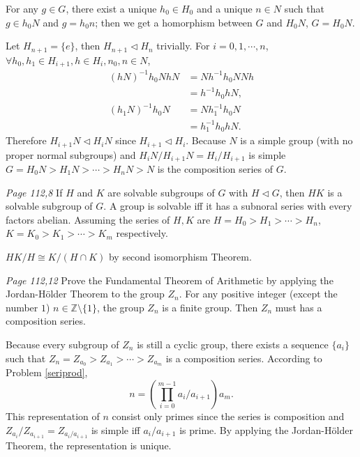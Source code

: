 \begin{enumerate}
For any $g\in G$, there exist a unique $h_0\in H_0$ and a unique $n\in N$ such that $g\in h_0N$ and $g=h_0 n$; then we get a homorphism between $G$ and $H_0N$, $G=H_0N$.

Let $H_{n+1}=\{e\}$, then $H_{n+1}\lhd H_{n}$ trivially. For $i=0,1,\cdots,n$, $\forall h_0, h_1\in H_{i+1}, h\in H_{i}, n_0,n\in N$, 
\begin{align*}
	(hN)^{-1} h_0N hN &= N h^{-1} h_0N Nh
	\\ &= h^{-1} h_0 h N,
	\\ (h_1N)^{-1} h_0N &= N h_1^{-1} h_0N
	\\ &= h_1^{-1} h_0 h N.
\end{align*}
Therefore $H_{i+1}N\lhd H_{i}N$ since $H_{i+1}\lhd H_{i}$. Because $N$ is a simple group (with no proper normal subgroups) and $H_{i}N / H_{i+1}N=H_i/H_{i+1}$ is simple 
$G=H_0N>H_1N>\cdots>H_nN>N$ is the composition series of $G$.

\prob\textit{Page 112,8} If $H$ and $K$ are solvable subgroups of $G$ with $H\lhd G$, then $HK$ is a solvable subgroup of $G$.
\soln A group is solvable iff it has a subnoral series with every factors abelian. Assuming the series of $H,K$ are 
$H=H_0>H_1>\cdots>H_n$,  
$K=K_0>K_1>\cdots>K_m$ respectively. 

$HK/H\cong K/(H\cap K)$ by second isomorphism Theorem. \newpage

\prob\textit{Page 112,12} Prove the Fundamental Theorem of Arithmetic by applying the Jordan-H\"{o}lder Theorem to the group $Z_n$.
\soln
For any positive integer (except the number $1$) $n\in \mathbb{Z}\setminus\{1\}$, the group $Z_n$ is a finite group. Then $Z_n$ must has a composition series. 

Because every subgroup of $Z_n$ is still a cyclic group, there exists a sequence $\{a_i\}$ such that 
$Z_n=Z_{a_0}>Z_{a_1}>\cdots>Z_{a_m}$ is a composition series. According to Problem \ref{seriprod},
$$n= \left(\prod\limits_{i=0}^{m-1}a_i/a_{i+1}\right)a_m.$$
This representation of $n$ consist only primes since the series is composition and $Z_{a_i}/Z_{a_{i+1}}=Z_{a_i/a_{i+1}}$ is simple iff $a_i/a_{i+1}$ is prime. By applying the Jordan-H\"{o}lder Theorem, the representation is unique.

\end{enumerate}
